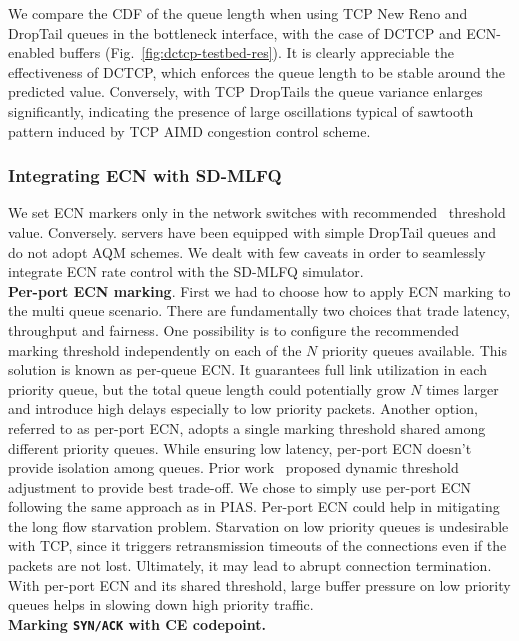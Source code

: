 We compare the CDF of the queue length when using TCP New Reno and DropTail queues in the bottleneck interface, with the case of DCTCP and ECN-enabled buffers (Fig.~\ref{fig:dctcp-testbed-res}).  
It is clearly appreciable the effectiveness of DCTCP, which enforces the queue length to be stable around the predicted value. Conversely, with TCP DropTails the queue variance enlarges significantly, indicating the presence of large oscillations typical of sawtooth pattern induced by TCP AIMD congestion control scheme.
\subsubsection{Integrating ECN with SD-MLFQ}
We set ECN markers only in the network switches with recommended~\cite{dctcp} threshold value. Conversely. servers have been equipped with simple DropTail queues and do not adopt AQM schemes. We dealt with few caveats in order to seamlessly integrate ECN rate control with the SD-MLFQ simulator. \\
\textbf{Per-port ECN marking}. First we had to choose how to apply ECN marking to the multi queue scenario. There are fundamentally two choices that trade latency, throughput and fairness. One possibility is to configure the recommended marking threshold independently on each of the $N$ priority queues available. This solution is known as per-queue ECN. It guarantees full link utilization in each priority queue, but the total queue length could potentially grow $N$ times larger and introduce high delays especially to low priority packets. Another option, referred to as per-port ECN, adopts a single marking threshold shared among different priority queues. While ensuring low latency, per-port ECN doesn't provide isolation among queues. Prior work~\cite{mqecn} proposed dynamic threshold adjustment to provide best trade-off. We chose to simply use per-port ECN following the same approach as in PIAS. Per-port ECN could help in mitigating the long flow starvation problem. Starvation on low priority queues is undesirable with TCP, since it triggers retransmission timeouts of the connections even if the packets are not lost. Ultimately, it may lead to abrupt connection termination. With per-port ECN and its shared threshold, large buffer pressure on low priority queues helps in slowing down high priority traffic. \\
\textbf{Marking \texttt{SYN/ACK} with CE codepoint.}
